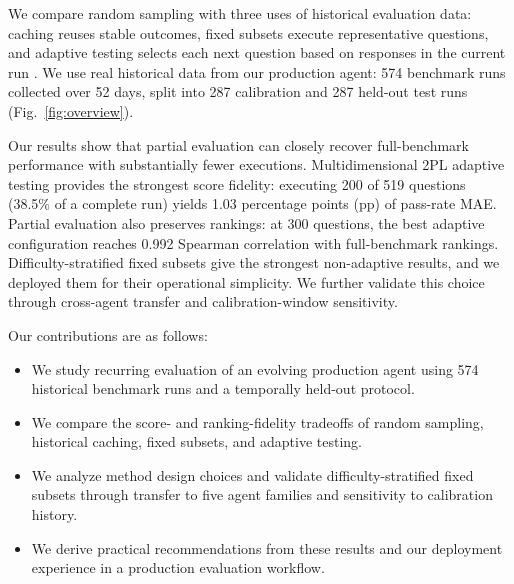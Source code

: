 We compare random sampling with three uses of historical evaluation data:
caching reuses stable outcomes, fixed subsets execute representative
questions, and adaptive testing selects each next question based on responses in the current run \citep{maiapolo2024tinybenchmarks,truong2025reliable}. 
We use real historical data from our production agent: 574 benchmark runs collected over 52
days, split into 287 calibration and 287 held-out test runs (Fig.~\ref{fig:overview}).


Our results show that partial evaluation can closely recover full-benchmark
performance with substantially fewer executions. 
Multidimensional 2PL adaptive testing provides the strongest score fidelity:
executing 200 of 519 questions (38.5\% of a complete run) yields 1.03
percentage points (pp) of pass-rate MAE. 
Partial evaluation also
preserves rankings: at 300 questions, the best adaptive configuration reaches
0.992 Spearman correlation with full-benchmark rankings. Difficulty-stratified
fixed subsets give the strongest non-adaptive results, and we deployed them for
their operational simplicity. We further validate this choice through cross-agent transfer and calibration-window sensitivity. 


Our contributions are as follows:\vspace{-0.5em}

\begin{itemize}\itemsep -0.3em
  \item We study recurring evaluation of an evolving production agent using 574
        historical benchmark runs and a temporally held-out protocol.
  \item We compare the score- and ranking-fidelity tradeoffs of random sampling,
        historical caching, fixed subsets, and adaptive testing.
  \item We analyze method design choices and validate difficulty-stratified
        fixed subsets through transfer to five agent families and sensitivity
        to calibration history.
  \item We derive practical recommendations from these results and our
        deployment experience in a production evaluation workflow.
\end{itemize}

